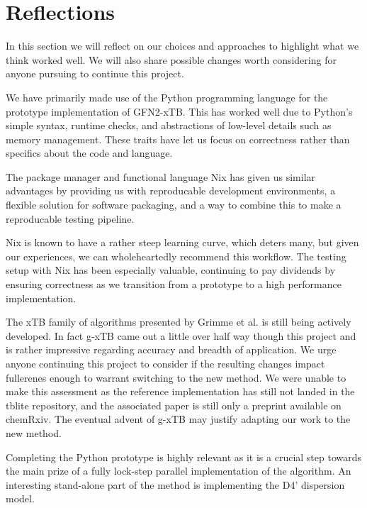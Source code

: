 \chapter{Reflections}\label{sec:reflection}
In this section we will reflect on our choices and approaches to highlight what we think worked well. We will also share possible changes worth considering for anyone pursuing to continue this project.%

We have primarily made use of the Python programming language for the prototype implementation of GFN2-xTB. This has worked well due to Python's simple syntax, runtime checks, and abstractions of low-level details such as memory management. These traits have let us focus on correctness rather than specifics about the code and language.

The package manager and functional language Nix has given us similar advantages by providing us with reproducable development environments, a flexible solution for software packaging, and a way to combine this to make a reproducable testing pipeline. %

Nix is known to have a rather steep learning curve, which deters many, but given our experiences, we can wholeheartedly recommend this workflow. The testing setup with Nix has been especially valuable, continuing to pay dividends by ensuring correctness as we transition from a prototype to a high performance implementation.

The xTB family of algorithms presented by Grimme et al. is still being actively developed. In fact g-xTB came out a little over half way though this project and is rather impressive regarding accuracy and breadth of application. We urge anyone continuing this project to consider if the resulting changes impact fullerenes enough to warrant switching to the new method. We were unable to make this assessment as the reference implementation has still not landed in the tblite repository, and the associated paper is still only a preprint available on chemRxiv\cite{g-xtb}. 
The eventual advent of g-xTB may justify adapting our work to the new method. 

Completing the Python prototype is highly relevant as it is a crucial step towards the main prize of a fully lock-step parallel implementation of the algorithm. 
An interesting stand-alone part of the method is implementing the D4' dispersion model. 


